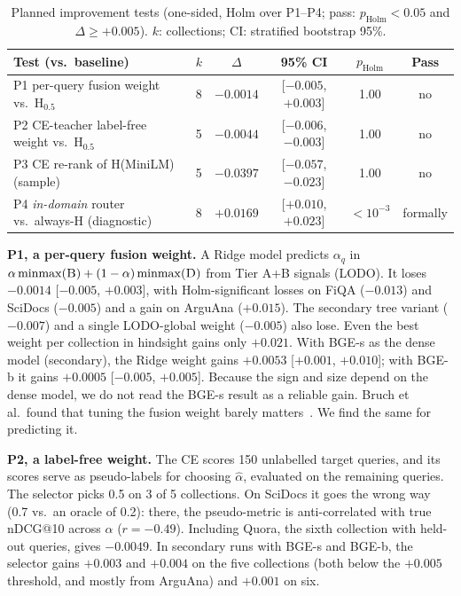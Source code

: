 \documentclass[conference]{IEEEtran}
\makeatletter
\newcommand{\B}{\textsc{B}}
\newcommand{\Dn}{\textsc{D}}
\newcommand{\Hy}{\textsc{H}}
\newcommand{\ndcg}{nDCG@10}
\makeatother
\begin{document}
\begin{table}[t]
\centering
\caption{Planned improvement tests (one-sided, Holm over P1--P4; pass: $p_{\text{Holm}}<0.05$ and $\Delta\geq+0.005$). $k$: collections; CI: stratified bootstrap 95\%.}
\label{tab:improve}
\footnotesize
\setlength{\tabcolsep}{1.8pt}
\begin{tabular}{@{}>{\raggedright\arraybackslash}p{2.75cm}ccccc@{}}
\toprule
Test (vs.\ baseline) & $k$ & $\Delta$ & 95\% CI & $p_{\text{Holm}}$ & Pass \\
\midrule
P1 per-query fusion weight vs.\ \Hy$_{0.5}$ & 8 & $-0.0014$ & [$-0.005$, $+0.003$] & 1.00 & no \\
P2 CE-teacher label-free weight vs.\ \Hy$_{0.5}$ & 5 & $-0.0044$ & [$-0.006$, $-0.003$] & 1.00 & no \\
P3 CE re-rank of \Hy(MiniLM) (sample) & 5 & $-0.0397$ & [$-0.057$, $-0.023$] & 1.00 & no \\
P4 \emph{in-domain} router vs.\ always-\Hy{} (diagnostic) & 8 & $+0.0169$ & [$+0.010$, $+0.023$] & $<10^{-3}$ & formally \\
\bottomrule
\end{tabular}
\end{table}

\textbf{P1, a per-query fusion weight.} A Ridge model predicts $\alpha_q$ in $\alpha\,\mathrm{minmax}(\B)+(1-\alpha)\,\mathrm{minmax}(\Dn)$ from Tier A+B signals (LODO). It loses $-0.0014$ [$-0.005$, $+0.003$], with Holm-significant losses on FiQA ($-0.013$) and SciDocs ($-0.005$) and a gain on ArguAna ($+0.015$). The secondary tree variant ($-0.007$) and a single LODO-global weight ($-0.005$) also lose. Even the best weight per collection in hindsight gains only $+0.021$. With BGE-s as the dense model (secondary), the Ridge weight gains $+0.0053$ [$+0.001$, $+0.010$]; with BGE-b it gains $+0.0005$ [$-0.005$, $+0.005$]. Because the sign and size depend on the dense model, we do not read the BGE-s result as a reliable gain. Bruch et al.\ found that tuning the fusion weight barely matters~\cite{bruch2024fusion}. We find the same for predicting it.

\textbf{P2, a label-free weight.} The CE scores 150 unlabelled target queries, and its scores serve as pseudo-labels for choosing $\hat\alpha$, evaluated on the remaining queries. The selector picks 0.5 on 3 of 5 collections. On SciDocs it goes the wrong way (0.7 vs.\ an oracle of 0.2): there, the pseudo-metric is anti-correlated with true \ndcg{} across $\alpha$ ($r=-0.49$). Including Quora, the sixth collection with held-out queries, gives $-0.0049$. In secondary runs with BGE-s and BGE-b, the selector gains $+0.003$ and $+0.004$ on the five collections (both below the $+0.005$ threshold, and mostly from ArguAna) and $+0.001$ on six.
\end{document}
